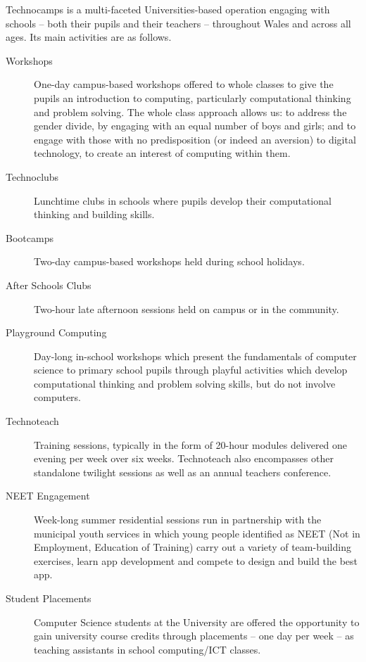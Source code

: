 \documentclass{sig-alternate}
\begin{document}
Technocamps is a multi-faceted Universities-based
operation engaging with schools -- both their pupils and their teachers --
throughout Wales and across all ages. Its main activities are as follows.

\begin{description}
\item[Workshops]
One-day campus-based workshops offered to whole classes
to give the pupils an introduction to computing,
particularly computational thinking and problem solving.
The whole class approach allows us: to address the gender divide,
by engaging with an equal number of boys and girls;
and to engage with those with no predisposition (or indeed an aversion)
to digital technology, to create an interest of computing within them.
\item[Technoclubs]
Lunchtime clubs in schools where pupils develop
their computational thinking and building skills.
\item[Bootcamps]
Two-day campus-based workshops held during school holidays.
\item[After Schools Clubs]
Two-hour late afternoon sessions held on campus or in the community.
\item[Playground Computing]
Day-long in-school workshops which present
the fundamentals of computer science to primary school pupils
through playful activities which develop computational thinking
and problem solving skills, but do not involve computers.
\item[Technoteach]
Training sessions, typically in the form of 20-hour modules
delivered one evening per week over six weeks.
Technoteach also encompasses other standalone twilight sessions
as well as an annual teachers conference.
\item[NEET Engagement]
Week-long summer residential sessions run in partnership with
the municipal youth services in which young people identified
as NEET (Not in Employment, Education of Training)
carry out a variety of team-building exercises,
learn app development and compete to design and build the best app.
\item[Student Placements]
Computer Science students at the University are offered
the opportunity to gain university course credits through
placements -- one day per week -- as teaching assistants
in school computing/ICT classes.
\end{description}
\end{document}
